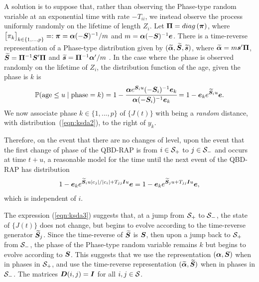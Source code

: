 A solution is to suppose that, rather than observing the Phase-type random variable at an exponential time with rate \(-T_{ii}\), we instead observe the process uniformly randomly on the lifetime of length \(Z_i\). Let \(\boldsymbol \Pi = diag\left(\boldsymbol \pi \right)\), where \(\begin{bmatrix} \pi_k \end{bmatrix}_{k\in\{1,\dots,p\}}=:\boldsymbol \pi=\boldsymbol \alpha (-\boldsymbol{S})^{-1}/m\) and \(m=\boldsymbol \alpha (-\boldsymbol{S})^{-1}\boldsymbol e\). There is a time-reverse representation of a Phase-type distribution given by \((\widetilde{\boldsymbol \alpha}, \widetilde{\boldsymbol S}, \widetilde{\boldsymbol s})\), where \(\widetilde{\boldsymbol \alpha} = m\boldsymbol s' \boldsymbol \Pi \), \(\widetilde{\boldsymbol S} = \boldsymbol\Pi^{-1}\boldsymbol S'\boldsymbol \Pi\) and \(\widetilde{\boldsymbol s} = \boldsymbol \Pi^{-1}\boldsymbol \alpha'/m\) \cite[Page 91]{a2008}. In the case where the phase is observed randomly on the lifetime of \(Z_i\), the distribution function of the age, given the phase is \(k\) is \cite[Lemma 3.1]{hmp2017}
\begin{align}\mathbb P(\mbox{age}\leq u \mid \mbox{phase}=k) = 1-\cfrac{\boldsymbol \alpha e^{\boldsymbol S_iu}(-\boldsymbol S_i)^{-1}\boldsymbol e_k}{\boldsymbol \alpha (-\boldsymbol S_i)^{-1}\boldsymbol e_k} = 1- \boldsymbol e_k e^{\widetilde{ \boldsymbol S}_iu}\boldsymbol e.\label{eqn:ksda2}\end{align}
We now associate phase \(k\in\{1,...,p\}\) of \(\{J(t)\}\) with being a \emph{random} distance, with distribution~(\ref{eqn:ksda2}), to the right of \(y_k\).

Therefore, on the event that there are no changes of level, upon the event that the first change of phase of the QBD-RAP is from \(i\in\mathcal{S}_+\) to \(j\in\mathcal{S}_-\) and occurs at time \(t+u\), a reasonable model for the time until the next event of the QBD-RAP has distribution 
\begin{align}
	1- \boldsymbol e_k e^{\widetilde{ \boldsymbol S}_iu|c_j|/|c_i| + T_{jj}\boldsymbol Iu}\boldsymbol e = 1- \boldsymbol e_k e^{\widetilde{ \boldsymbol S}_ju+ T_{jj}\boldsymbol Iu}\boldsymbol e,\label{eqn:ksda3}
\end{align}
which is independent of \(i\). 

The expression (\ref{eqn:ksda3}) suggests that, at a jump from \(\mathcal{S}_+\) to \(\mathcal{S}_-\), the state of \(\{J(t)\}\) does not change, but begins to evolve according to the time-reverse generator \(\widetilde{\boldsymbol S}_j\). Since the time-reverse of \(\widetilde{\boldsymbol S}\) is \(\boldsymbol S\), then upon a jump back to \(\mathcal{S}_+\) from \(\mathcal{S}_-\), the phase of the Phase-type random variable remains \(k\) but begins to evolve according to \(\boldsymbol S\). This suggests that we use the representation \((\boldsymbol \alpha, \boldsymbol S)\) when in phases in \(\mathcal{S}_+\), and use the time-reverse representation \((\widetilde{\boldsymbol \alpha}, \widetilde{\boldsymbol S})\) when in phases in \(\mathcal{S}_-\). The matrices \(\boldsymbol D(i,j)=\boldsymbol I\) for all \(i,j\in\mathcal{S}\). 

